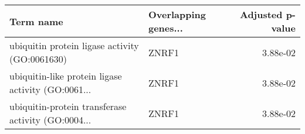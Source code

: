 \begin{tabular}{llr}
\toprule
                                         Term name & Overlapping genes... &  Adjusted p-value \\
\midrule
    ubiquitin protein ligase activity (GO:0061630) &                ZNRF1 &          3.88e-02 \\
ubiquitin-like protein ligase activity (GO:0061... &                ZNRF1 &          3.88e-02 \\
ubiquitin-protein transferase activity (GO:0004... &                ZNRF1 &          3.88e-02 \\
\bottomrule
\end{tabular}
